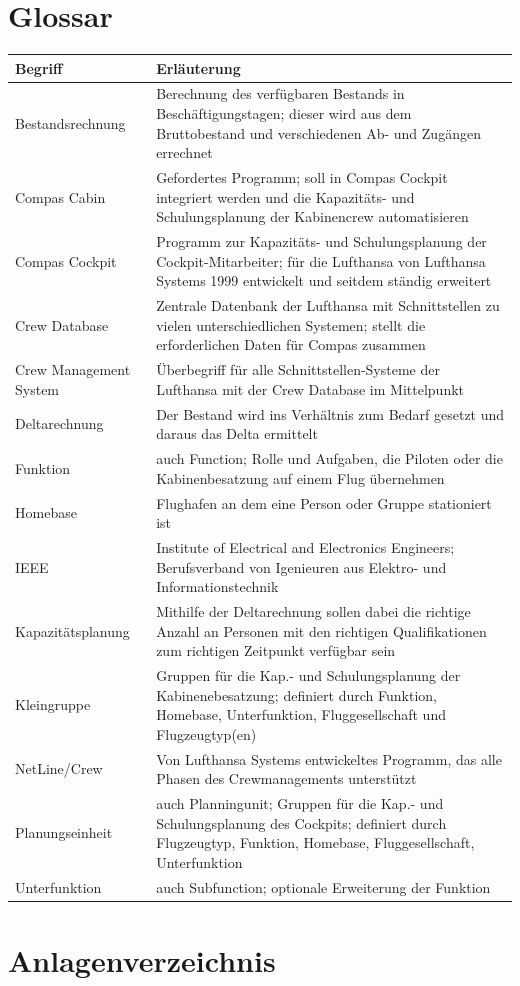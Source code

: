 \documentclass [12pt, a4paper, oneside, titlepage, ngerman]{article}
\begin{document}
\newpage






\newpage

\setcounter{page}{4}
\section* {Glossar}


\begin{tabularx}{\textwidth}{l|X}
\textbf{Begriff} & \textbf{Erläuterung} \\\hline
Bestandsrechnung & Berechnung des verfügbaren Bestands in Beschäftigungstagen; dieser wird aus dem Bruttobestand und verschiedenen Ab- und Zugängen errechnet\\
Compas Cabin & Gefordertes Programm; soll in Compas Cockpit integriert werden und die Kapazitäts- und Schulungsplanung der Kabinencrew automatisieren\\
Compas Cockpit & Programm zur Kapazitäts- und Schulungsplanung der Cockpit-Mitarbeiter; für die Lufthansa von Lufthansa Systems 1999 entwickelt und seitdem ständig erweitert\\
Crew Database & Zentrale Datenbank der Lufthansa mit Schnittstellen zu vielen unterschiedlichen Systemen; stellt die erforderlichen Daten für Compas zusammen\\
Crew Management System & Überbegriff für alle Schnittstellen-Systeme der Lufthansa mit der Crew Database im Mittelpunkt\\
Deltarechnung & Der Bestand wird ins Verhältnis zum Bedarf gesetzt und daraus das Delta ermittelt\\
Funktion & auch Function; Rolle und Aufgaben, die Piloten oder die Kabinenbesatzung auf einem Flug übernehmen \\
Homebase & Flughafen an dem eine Person oder Gruppe stationiert ist \\  
IEEE & Institute of Electrical and Electronics Engineers; Berufsverband von Igenieuren aus Elektro- und Informationstechnik \\
Kapazitätsplanung & Mithilfe der Deltarechnung sollen dabei die richtige Anzahl an Personen mit den richtigen Qualifikationen zum richtigen Zeitpunkt verfügbar sein\\
Kleingruppe & Gruppen für die Kap.- und Schulungsplanung der Kabinenebesatzung; definiert durch  Funktion, Homebase, Unterfunktion, Fluggesellschaft und Flugzeugtyp(en)\\
NetLine/Crew & Von Lufthansa Systems entwickeltes Programm, das alle Phasen des Crewmanagements unterstützt\\
Planungseinheit & auch Planningunit; Gruppen für die Kap.- und Schulungsplanung des Cockpits; definiert durch Flugzeugtyp, Funktion, Homebase, Fluggesellschaft, Unterfunktion\\
Unterfunktion & auch Subfunction; optionale Erweiterung der Funktion \\

\end{tabularx}

\newpage

\section* {Anlagenverzeichnis}
\newpage
\end{document}
